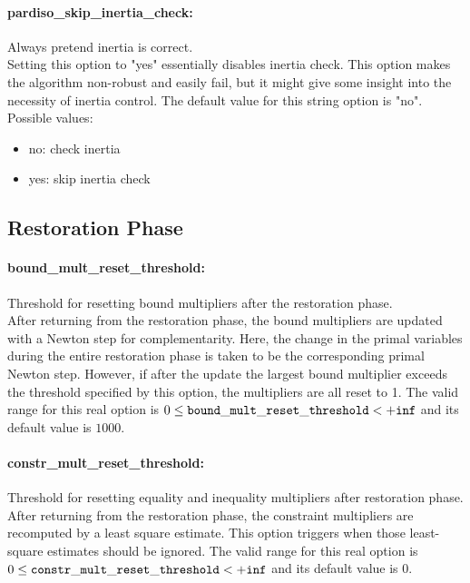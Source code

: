 \paragraph{pardiso\_skip\_inertia\_check:}\label{opt:pardiso_skip_inertia_check} Always pretend inertia is correct. \\
 Setting this option to "yes" essentially disables inertia check. This option makes the algorithm non-robust and easily fail, but it might give some insight into the necessity of inertia control. The default value for this string option is "no".
\\ 
Possible values:
\begin{itemize}
   \item no: check inertia
   \item yes: skip inertia check
\end{itemize}

\subsection{Restoration Phase}
\label{sec:RestorationPhase}
\paragraph{bound\_mult\_reset\_threshold:}\label{opt:bound_mult_reset_threshold} Threshold for resetting bound multipliers after the restoration phase. \\
 After returning from the restoration phase, the bound multipliers are updated with a Newton step for complementarity.  Here, the change in the primal variables during the entire restoration phase is taken to be the corresponding primal Newton step. However, if after the update the largest bound multiplier exceeds the threshold specified by this option, the multipliers are all reset to 1. The valid range for this real option is 
$0 \le {\tt bound\_mult\_reset\_threshold } <  {\tt +inf}$
and its default value is $1000$.


\paragraph{constr\_mult\_reset\_threshold:}\label{opt:constr_mult_reset_threshold} Threshold for resetting equality and inequality multipliers after restoration phase. \\
 After returning from the restoration phase, the constraint multipliers are recomputed by a least square estimate.  This option triggers when those least-square estimates should be ignored. The valid range for this real option is 
$0 \le {\tt constr\_mult\_reset\_threshold } <  {\tt +inf}$
and its default value is $0$.


